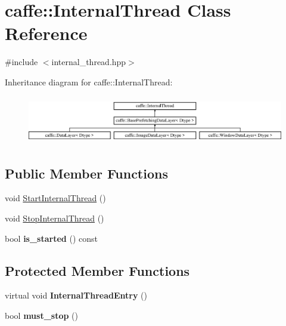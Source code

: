 \hypertarget{classcaffe_1_1InternalThread}{}\section{caffe\+:\+:Internal\+Thread Class Reference}
\label{classcaffe_1_1InternalThread}


{\ttfamily \#include $<$internal\+\_\+thread.\+hpp$>$}

Inheritance diagram for caffe\+:\+:Internal\+Thread\+:\begin{figure}[H]
\begin{center}
\leavevmode
\includegraphics[height=2.121212cm]{classcaffe_1_1InternalThread}
\end{center}
\end{figure}
\subsection*{Public Member Functions}
\begin{DoxyCompactItemize}
\item 
void \hyperlink{classcaffe_1_1InternalThread_acffc1d9bc9e78f4146ba2d16f593fca7}{Start\+Internal\+Thread} ()
\item 
void \hyperlink{classcaffe_1_1InternalThread_ac72d8e2a23dbbe5203d5003dd67af73e}{Stop\+Internal\+Thread} ()
\item 
bool {\bfseries is\+\_\+started} () const \hypertarget{classcaffe_1_1InternalThread_a6c452462793500206228c69de8b6758c}{}\label{classcaffe_1_1InternalThread_a6c452462793500206228c69de8b6758c}

\end{DoxyCompactItemize}
\subsection*{Protected Member Functions}
\begin{DoxyCompactItemize}
\item 
virtual void {\bfseries Internal\+Thread\+Entry} ()\hypertarget{classcaffe_1_1InternalThread_a40b9506bc2985fdc189cff4fa680880b}{}\label{classcaffe_1_1InternalThread_a40b9506bc2985fdc189cff4fa680880b}

\item 
bool {\bfseries must\+\_\+stop} ()\hypertarget{classcaffe_1_1InternalThread_a16fd45781962d8f59556b9323f11a397}{}\label{classcaffe_1_1InternalThread_a16fd45781962d8f59556b9323f11a397}

\end{DoxyCompactItemize}



